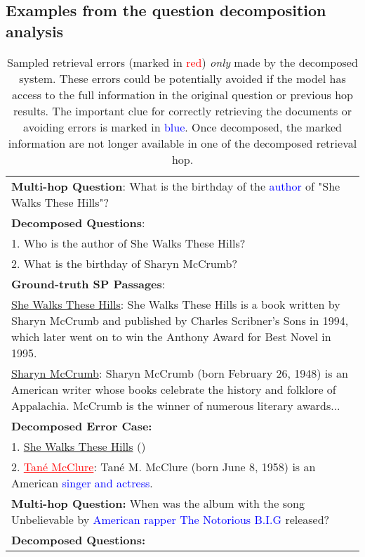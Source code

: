 \documentclass{article} \usepackage{iclr2021_conference,times}
\begin{document}
\clearpage

\subsection{Examples from the question decomposition analysis}
\label{appendix:decomposed_exmaples}
\begin{table*}[h]
    \centering
    \caption{Sampled retrieval errors (marked in \textcolor{red}{red}) \textit{only} made by the decomposed system. These errors could be potentially avoided if the model has access to the full information in the original question or previous hop results. The important clue for correctly retrieving the documents or avoiding errors is marked in \textcolor{blue}{blue}. Once decomposed, the marked information are not longer available in one of the decomposed retrieval hop.}
    \begin{tabular}{p{}}
    \toprule
     \textbf{Multi-hop Question}:  What is the birthday of the \textcolor{blue}{author} of "She Walks These Hills"?\\
     \textbf{Decomposed Questions}:\\
     1. Who is the author of She Walks These Hills?\\
     2. What is the birthday of Sharyn McCrumb?\\
     \textbf{Ground-truth SP Passages}: \\
     \underline{She Walks These Hills}: She Walks These Hills is a book written by Sharyn McCrumb and published by Charles Scribner's Sons in 1994, which later went on to win the Anthony Award for Best Novel in 1995.\\
     \underline{Sharyn McCrumb}: Sharyn McCrumb (born February 26, 1948) is an American writer whose books celebrate the history and folklore of Appalachia. McCrumb is the winner of numerous literary awards... \\
     \textbf{Decomposed Error Case:} \\
     1. \underline{She Walks These Hills} ()\\
     2. \textcolor{red}{\underline{Tané McClure}}: Tané M. McClure (born June 8, 1958) is an American \textcolor{blue}{singer and actress}. \\
     \midrule
    \textbf{Multi-hop Question:} When was the album with the song Unbelievable by \textcolor{blue}{American rapper The Notorious B.I.G} released? \\
    \textbf{Decomposed Questions:} \\

\end{tabular}
\end{table*}
\end{document}
